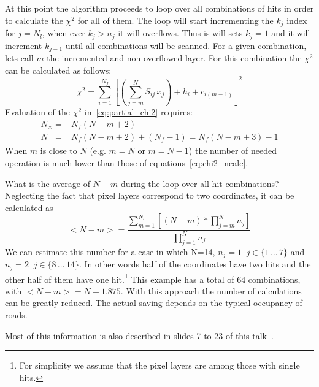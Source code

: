 \documentclass[a4paper,11pt]{article}
\begin{document}
At this point the algorithm proceeds to loop over all combinations of hits in order to calculate the $\chi^2$ for all of them.
The loop will start incrementing the $k_j$ index for $j=N_l$, when ever $k_j>n_j$ it will overflows.
Thus is will sets $k_j=1$ and it will increment $k_{j-1}$ until all combinations will be scanned.
For a given combination, lets call $m$ the incremented and non overflowed layer. For this combination the $\chi^2$ can be calculated as follows:
\begin{equation}
  \label{eq:partial_chi2}
  \chi^2 = \sum_{i=1}^{N_f} \left[ \left( \sum_{j=m}^N S_{ij} \, x_j \right) + h_i + c_{i (m-1)}\right]^2
\end{equation}
Evaluation of the $\chi^2$ in~\eqref{eq:partial_chi2} requires:
\begin{subequations}
  \begin{align}
    N_\times =& N_f (N-m+2)\\
    N_+ =& N_f (N-m+2) + (N_f-1) = N_f (N-m+3) - 1
  \end{align}
\end{subequations}
When $m$ is close to $N$ (e.g. $m=N$ or $m=N-1$) the number of needed operation is much lower than those of equations~\eqref{eq:chi2_ncalc}. 

What is the average of $N-m$ during the loop over all hit combinations?
Neglecting the fact that pixel layers correspond to two coordinates, it can be calculated as
\begin{equation}
  \label{eq:partial_chi2}
  <N-m> = \frac { \sum_{m=1}^{N_l} \left[ (N-m)*\prod_{j=m}^N n_j \right] } {\prod_{j=1}^N n_j}
\end{equation}
We can estimate this number for a case in which N=14, $n_j=1 \, \ \, j \in \{1\, \ldots\, 7\}$ and $n_j=2 \ \, \,  j \in \{8\, \ldots\, 14\}$.
In other words half of the coordinates have two hits and the other half of them have one hit.\footnote{For simplicity we assume that the pixel layers are among those with single hits.}
This example has a total of 64 combinations, with $<N-m> = N - 1.875$. 
With this approach the number of calculations can be greatly reduced. 
The actual saving depends on the typical occupancy of roads.

Most of this information is also described in slides 7 to 23 of this talk~\cite{FTK_fits}.

\end{document}
